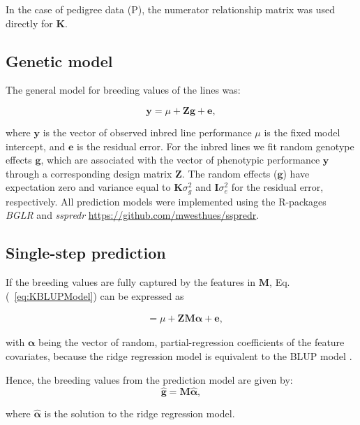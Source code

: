 \documentclass[12pt,titlepage]{article}
\begin{document}
In the case of pedigree data (P), the numerator relationship matrix was used
directly for $\mathbf{K}$.


\subsection{Genetic model}
The general model for breeding values of the lines was:

\begin{equation} \label{eq:KBLUPModel}
  \mathbf{y} = \mu + \mathbf{Z} \mathbf{g} + \mathbf{e},
\end{equation}

where $\mathbf{y}$ is the vector of observed inbred line performance $\mu$ is
the fixed model intercept, and $\mathbf{e}$ is the residual error.
For the inbred lines we fit random genotype effects $\mathbf{g}$, which are
associated with the vector of phenotypic performance $\mathbf{y}$ through a
corresponding design matrix $\mathbf{Z}$.
The random effects ($\mathbf{g}$) have expectation zero and variance equal to
$\mathbf{K} \sigma^{2}_{g}$ and $\mathbf{I} \sigma^2_{e}$ for the residual
error, respectively.
All prediction models were implemented using the R-packages \textit{BGLR}
\cite{Perez2014} and \textit{sspredr}
\url{https://github.com/mwesthues/sspredr}.


\subsection{Single-step prediction}
If the breeding values are fully captured by the features in $\mathbf{M}$,
Eq.(~\ref{eq:KBLUPModel}) can be expressed as~\cite{Fernando2014} 

\begin{align} \label{eq:KBLUPModelSimplified}
	&= \mu + \mathbf{Z} \mathbf{M} \boldsymbol{\alpha} + \boldsymbol{e},
\end{align}

with $\boldsymbol{\alpha}$ being the vector of random, partial-regression
coefficients of the feature covariates, because the ridge regression model is
equivalent to the BLUP model \cite{Ruppert2003}.


Hence, the breeding values from the prediction model are given by:
\begin{equation} \label{eq:mrnaebv}
	\mathbf{\hat{g}} = \mathbf{M}\boldsymbol{\hat{\alpha}},
\end{equation}

where $\boldsymbol{\hat{\alpha}}$ is the solution to the ridge regression model.
\end{document}
